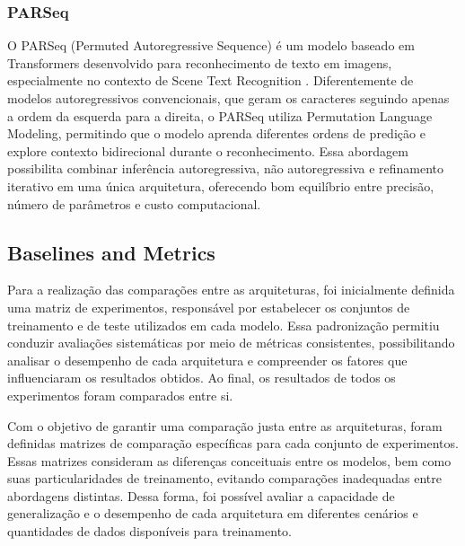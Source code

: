 \documentclass[11pt,a4paper]{article}
\begin{document}
\subsubsection{PARSeq}

O PARSeq (Permuted Autoregressive Sequence) é um modelo baseado em Transformers desenvolvido para reconhecimento de texto em imagens, especialmente no contexto de Scene Text Recognition \cite{bautista2022parseq}. Diferentemente de modelos autoregressivos convencionais, que geram os caracteres seguindo apenas a ordem da esquerda para a direita, o PARSeq utiliza Permutation Language Modeling, permitindo que o modelo aprenda diferentes ordens de predição e explore contexto bidirecional durante o reconhecimento. Essa abordagem possibilita combinar inferência autoregressiva, não autoregressiva e refinamento iterativo em uma única arquitetura, oferecendo bom equilíbrio entre precisão, número de parâmetros e custo computacional.

\subsection{Baselines and Metrics}
\label{sec:baselines}

Para a realização das comparações entre as arquiteturas, foi inicialmente definida uma matriz de experimentos, responsável por estabelecer os conjuntos de treinamento e de teste utilizados em cada modelo. Essa padronização permitiu conduzir avaliações sistemáticas por meio de métricas consistentes, possibilitando analisar o desempenho de cada arquitetura e compreender os fatores que influenciaram os resultados obtidos. Ao final, os resultados de todos os experimentos foram comparados entre si.

Com o objetivo de garantir uma comparação justa entre as arquiteturas, foram definidas matrizes de comparação específicas para cada conjunto de experimentos. Essas matrizes consideram as diferenças conceituais entre os modelos, bem como suas particularidades de treinamento, evitando comparações inadequadas entre abordagens distintas. Dessa forma, foi possível avaliar a capacidade de generalização e o desempenho de cada arquitetura em diferentes cenários e quantidades de dados disponíveis para treinamento.
\end{document}
